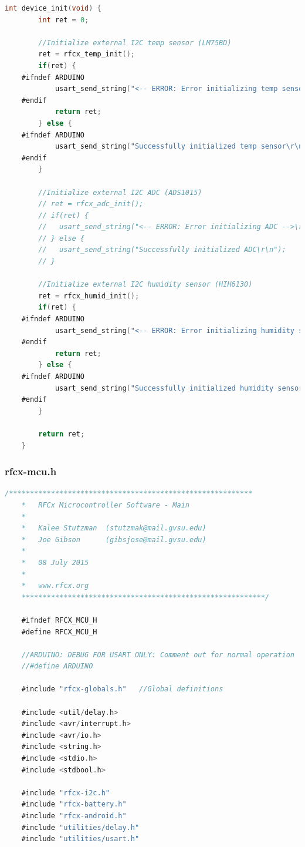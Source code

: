 \documentclass{article}
\numberwithin{figure}{section}
\numberwithin{equation}{section}
\begin{document}
{\begin{lstlisting}[language=C,label=lst:rfcx-mcu.c,caption=rfcx-mcu.c]
    int device_init(void) {
    	int ret = 0;

    	//Initialize external I2C temp sensor (LM75BD)
    	ret = rfcx_temp_init();
    	if(ret) {
    #ifndef ARDUINO
    		usart_send_string("<-- ERROR: Error initializing temp sensor -->\r\n");
    #endif
    		return ret;
    	} else {
    #ifndef ARDUINO
    		usart_send_string("Successfully initialized temp sensor\r\n");
    #endif
    	}

    	//Initialize external I2C ADC (ADS1015)
    	// ret = rfcx_adc_init();
    	// if(ret) {
    	// 	 usart_send_string("<-- ERROR: Error initializing ADC -->\r\n");
    	// } else {
    	// 	 usart_send_string("Successfully initialized ADC\r\n");
    	// }

    	//Initialize external I2C humidity sensor (HIH6130)
    	ret = rfcx_humid_init();
    	if(ret) {
    #ifndef ARDUINO
    		usart_send_string("<-- ERROR: Error initializing humidity sensor -->\r\n");
    #endif
    		return ret;
    	} else {
    #ifndef ARDUINO
    		usart_send_string("Successfully initialized humidity sensor\r\n");
    #endif
    	}

    	return ret;
    }
\end{lstlisting}

\subsubsection{rfcx-mcu.h}\label{sect:rfcx-mcu.h}
\begin{lstlisting}[language=C,label=lst:rfcx-mcu.h,caption=rfcx-mcu.h]
    /**********************************************************
    *	RFCx Microcontroller Software - Main
    *
    *	Kalee Stutzman 	(stutzmak@mail.gvsu.edu)
    *	Joe Gibson		(gibsjose@mail.gvsu.edu)
    *
    *	08 July 2015
    *
    *   www.rfcx.org
    **********************************************************/

    #ifndef RFCX_MCU_H
    #define RFCX_MCU_H

    //ARDUINO: DEBUG FOR USART ONLY: Comment out for normal operation
    //#define ARDUINO

    #include "rfcx-globals.h"   //Global definitions

    #include <util/delay.h>
    #include <avr/interrupt.h>
    #include <avr/io.h>
    #include <string.h>
    #include <stdio.h>
    #include <stdbool.h>

    #include "rfcx-i2c.h"
    #include "rfcx-battery.h"
    #include "rfcx-android.h"
    #include "utilities/delay.h"
    #include "utilities/usart.h"


\end{lstlisting}}
\end{document}
